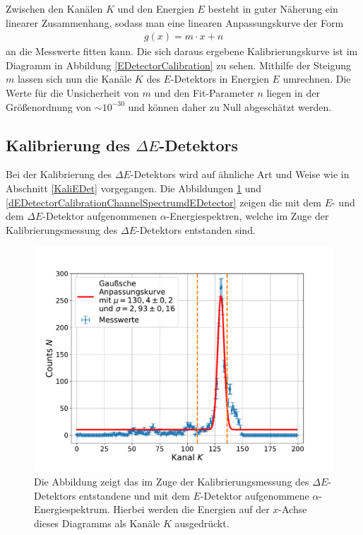 \noindent Zwischen den Kanälen $K$ und den Energien $E$ besteht in guter Näherung ein linearer Zusammenhang, sodass man eine linearen Anpassungskurve der Form
\begin{align} \label{line}
g(x)=m\cdot x + n
\end{align}
\noindent an die Messwerte fitten kann.
Die sich daraus ergebene Kalibrierungskurve ist im Diagramm in Abbildung \ref{EDetectorCalibration} zu sehen.
Mithilfe der Steigung $m$ lassen sich nun die Kanäle $K$ des $E$-Detektors in Energien $E$ umrechnen.
Die Werte für die Unsicherheit von $m$ und den Fit-Parameter $n$ liegen in der Größenordnung von $\sim10^{-30}$ und können daher zu Null abgeschätzt werden.

\subsection{Kalibrierung des $\Delta E$-Detektors}

Bei der Kalibrierung des $\Delta E$-Detektors wird auf ähnliche Art und Weise wie in Abschnitt \ref{KaliEDet} vorgegangen.
Die Abbildungen \ref{dEDetectorCalibrationChannelSpectrumEDetector} und \ref{dEDetectorCalibrationChannelSpectrumdEDetector} zeigen die mit dem $E$- und dem $\Delta E$-Detektor aufgenommenen $\alpha$-Energiespektren, welche im Zuge der Kalibrierungsmessung des $\Delta E$-Detektors entstanden sind.
\begin{figure}[H]
	\centering
	\includegraphics[width=1.0\textwidth]{src/dEDetectorCalibrationChannelSpectrumEDetector}
	\caption{Die Abbildung zeigt das im Zuge der Kalibrierungsmessung des $\Delta E$-Detektors entstandene und mit dem $E$-Detektor aufgenommene $\alpha$-Energiespektrum. Hierbei werden die Energien auf der $x$-Achse dieses Diagramms als Kanäle $K$ ausgedrückt.}
	\label{dEDetectorCalibrationChannelSpectrumEDetector}
\end{figure}

